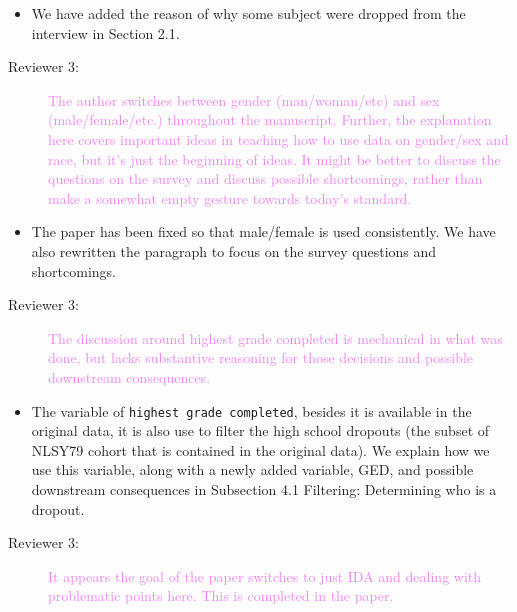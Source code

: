 \documentclass[12pt,a4paper,]{article}
\providecommand{\tightlist}{%
  \setlength{\itemsep}{0pt}\setlength{\parskip}{0pt}}
\begin{document}
\begin{itemize}
\tightlist
\item
  We have added the reason of why some subject were dropped from the interview in Section 2.1.
\end{itemize}

\begin{description}
\item[Reviewer 3:]\textcolor{violet}{The author switches between gender (man/woman/etc) and sex (male/female/etc.) throughout the manuscript. Further, the explanation here covers important ideas in teaching how to use data on gender/sex and race, but it’s just the beginning of ideas. It might be better to discuss the questions on the survey and discuss possible shortcomings, rather than make a somewhat empty gesture towards today’s standard.}
\end{description}

\begin{itemize}
\tightlist
\item
  The paper has been fixed so that male/female is used consistently. We have also rewritten the paragraph to focus on the survey questions and shortcomings.
\end{itemize}

\begin{description}
\item[Reviewer 3:]\textcolor{violet}{The discussion around highest grade completed is mechanical in what was done, but lacks substantive reasoning for those decisions and possible downstream consequences.}
\end{description}

\begin{itemize}
\tightlist
\item
  The variable of \texttt{highest\ grade\ completed}, besides it is available in the original data, it is also use to filter the high school dropouts (the subset of NLSY79 cohort that is contained in the original data). We explain how we use this variable, along with a newly added variable, GED, and possible downstream consequences in Subsection 4.1 Filtering: Determining who is a dropout.
\end{itemize}

\begin{description}
\item[Reviewer 3:]\textcolor{violet}{It appears the goal of the paper switches to just IDA and dealing with problematic points here. This is completed in the paper.} 
\end{description}
\end{document}
